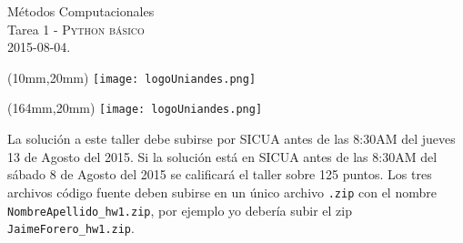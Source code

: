 \documentclass[11pt,letterpaper]{exam}
\begin{document}
\begin{center}
{\Large Métodos Computacionales} \\
Tarea 1 - \textsc{Python b\'asico}\\
2015-08-04.\\
\end{center}

\begin{textblock*}{40mm}(10mm,20mm)
  \texttt{[image: logoUniandes.png]}
\end{textblock*}

\begin{textblock*}{40mm}(164mm,20mm)
  \texttt{[image: logoUniandes.png]}
\end{textblock*}

\vspace{0.5cm}

\noindent
La solución a este taller debe subirse por SICUA antes de las 8:30AM
del jueves 13 de Agosto del 2015. 
\noindent
Si la soluci\'on est\'a en SICUA
antes de las 8:30AM del s\'abado 8 de Agosto del 2015 se calificar\'a
el taller sobre 125 puntos. 
\noindent
Los tres archivos c\'odigo fuente deben subirse en un \'unico archivo
\verb".zip" con el nombre \verb"NombreApellido_hw1.zip", por ejemplo
yo deber\'ia subir el zip \verb"JaimeForero_hw1.zip".

\vspace{0.5cm}
\end{document}
